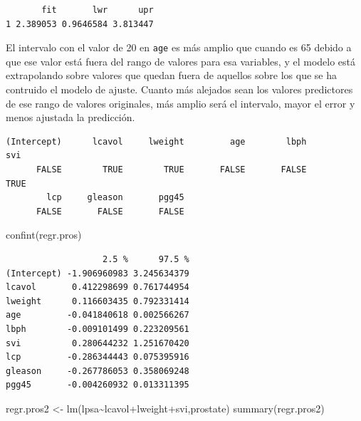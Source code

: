 \documentclass[
  letterpaper,
  DIV=11,
  numbers=noendperiod]{scrartcl}
\newenvironment{Shaded}{\begin{snugshade}}{\end{snugshade}}
\newcommand{\DecValTok}[1]{\textcolor[rgb]{0.68,0.00,0.00}{#1}}
\newcommand{\FloatTok}[1]{\textcolor[rgb]{0.68,0.00,0.00}{#1}}
\newcommand{\FunctionTok}[1]{\textcolor[rgb]{0.28,0.35,0.67}{#1}}
\newcommand{\NormalTok}[1]{\textcolor[rgb]{0.00,0.23,0.31}{#1}}
\newcommand{\OtherTok}[1]{\textcolor[rgb]{0.00,0.23,0.31}{#1}}
\newcommand{\SpecialCharTok}[1]{\textcolor[rgb]{0.37,0.37,0.37}{#1}}
\begin{document}
\begin{verbatim}
       fit       lwr      upr
1 2.389053 0.9646584 3.813447
\end{verbatim}

El intervalo con el valor de 20 en \texttt{age} es más amplio que cuando
es 65 debido a que ese valor está fuera del rango de valores para esa
variables, y el modelo está extrapolando sobre valores que quedan fuera
de aquellos sobre los que se ha contruido el modelo de ajuste. Cuanto
más alejados sean los valores predictores de ese rango de valores
originales, más amplio será el intervalo, mayor el error y menos
ajustada la predicción.

\begin{Shaded}
\end{Shaded}

\begin{verbatim}
(Intercept)      lcavol     lweight         age        lbph         svi 
      FALSE        TRUE        TRUE       FALSE       FALSE        TRUE 
        lcp     gleason       pgg45 
      FALSE       FALSE       FALSE 
\end{verbatim}

\begin{Shaded}
\begin{Highlighting}[]
 \FunctionTok{confint}\NormalTok{(regr.pros)}
\end{Highlighting}
\end{Shaded}

\begin{verbatim}
                   2.5 %      97.5 %
(Intercept) -1.906960983 3.245634379
lcavol       0.412298699 0.761744954
lweight      0.116603435 0.792331414
age         -0.041840618 0.002566267
lbph        -0.009101499 0.223209561
svi          0.280644232 1.251670420
lcp         -0.286344443 0.075395916
gleason     -0.267786053 0.358069248
pgg45       -0.004260932 0.013311395
\end{verbatim}

\begin{Shaded}
\begin{Highlighting}[]
\NormalTok{regr.pros2 }\OtherTok{\textless{}{-}} \FunctionTok{lm}\NormalTok{(lpsa}\SpecialCharTok{\textasciitilde{}}\NormalTok{lcavol}\SpecialCharTok{+}\NormalTok{lweight}\SpecialCharTok{+}\NormalTok{svi,prostate)}
\FunctionTok{summary}\NormalTok{(regr.pros2)}
\end{Highlighting}
\end{Shaded}
\end{document}
